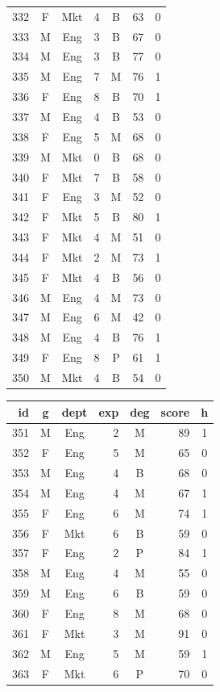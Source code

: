 \documentclass[11pt,a4paper]{article}
\begin{document}
\begin{center}
\begin{tabular}[t]{@{}r c c r c r c@{}}
332 & F & Mkt & 4 & B & 63 & 0 \\
333 & M & Eng & 3 & B & 67 & 0 \\
334 & M & Eng & 3 & B & 77 & 0 \\
335 & M & Eng & 7 & M & 76 & 1 \\
336 & F & Eng & 8 & B & 70 & 1 \\
337 & M & Eng & 4 & B & 53 & 0 \\
338 & F & Eng & 5 & M & 68 & 0 \\
339 & M & Mkt & 0 & B & 68 & 0 \\
340 & F & Mkt & 7 & B & 58 & 0 \\
341 & F & Eng & 3 & M & 52 & 0 \\
342 & F & Mkt & 5 & B & 80 & 1 \\
343 & F & Mkt & 4 & M & 51 & 0 \\
344 & F & Mkt & 2 & M & 73 & 1 \\
345 & F & Mkt & 4 & B & 56 & 0 \\
346 & M & Eng & 4 & M & 73 & 0 \\
347 & M & Eng & 6 & M & 42 & 0 \\
348 & M & Eng & 4 & B & 76 & 1 \\
349 & F & Eng & 8 & P & 61 & 1 \\
350 & M & Mkt & 4 & B & 54 & 0 \\
\bottomrule
\end{tabular}
\hfill
\begin{tabular}[t]{@{}r c c r c r c@{}}
\toprule
id & g & dept & exp & deg & score & h \\
\midrule
351 & M & Eng & 2 & M & 89 & 1 \\
352 & F & Eng & 5 & M & 65 & 0 \\
353 & M & Eng & 4 & B & 68 & 0 \\
354 & M & Eng & 4 & M & 67 & 1 \\
355 & F & Eng & 6 & M & 74 & 1 \\
356 & F & Mkt & 6 & B & 59 & 0 \\
357 & F & Eng & 2 & P & 84 & 1 \\
358 & M & Eng & 4 & M & 55 & 0 \\
359 & M & Eng & 6 & B & 59 & 0 \\
360 & F & Eng & 8 & M & 68 & 0 \\
361 & F & Mkt & 3 & M & 91 & 0 \\
362 & M & Eng & 5 & M & 59 & 1 \\
363 & F & Mkt & 6 & P & 70 & 0 \\

\end{tabular}
\end{center}
\end{document}

